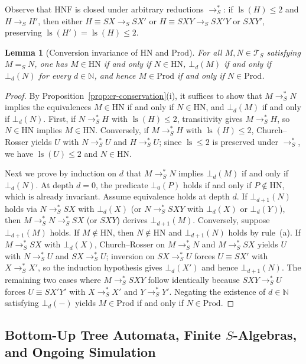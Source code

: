\documentclass[11pt,reqno]{amsart}
\numberwithin{equation}{section}
\theoremstyle{plain}
\newtheorem{lemma}[theorem]{Lemma}
\theoremstyle{definition}
\theoremstyle{remark}
\DeclareMathOperator{\ls}{ls}
\newcommand{\TS}{\mathcal{T}_S}
\newcommand{\HNF}{\mathrm{HNF}}
\newcommand{\HN}{\mathrm{HN}}
\newcommand{\Prod}{\mathrm{Prod}}
\newcommand{\redS}{\to_S}
\newcommand{\redSs}{\to_S^*}
\newcommand{\convS}{=_S}
\begin{document}
Observe that $\HNF$ is closed under arbitrary reductions $\redSs$: if $\ls(H) \le 2$ and $H \redS H'$, then either $H \equiv S X \redS S X'$ or $H \equiv S X Y \redS S X' Y$ or $S X Y'$, preserving $\ls(H') = \ls(H) \le 2$.

\begin{lemma}[Conversion invariance of $\HN$ and $\Prod$]\label{lem:conv-invariance}
For all $M, N \in \TS$ satisfying $M \convS N$, one has $M \in \HN$ if and only if $N \in \HN$, $\bot_d(M)$ if and only if $\bot_d(N)$ for every $d \in \mathbb{N}$, and hence $M \in \Prod$ if and only if $N \in \Prod$.
\end{lemma}

\begin{proof}
By Proposition~\ref{prop:cr-conservation}(i), it suffices to show that $M \redSs N$ implies the equivalences $M \in \HN$ if and only if $N \in \HN$, and $\bot_d(M)$ if and only if $\bot_d(N)$. First, if $N \redSs H$ with $\ls(H) \le 2$, transitivity gives $M \redSs H$, so $N \in \HN$ implies $M \in \HN$. Conversely, if $M \redSs H$ with $\ls(H) \le 2$, Church--Rosser yields $U$ with $N \redSs U$ and $H \redSs U$; since $\ls \le 2$ is preserved under $\redSs$, we have $\ls(U) \le 2$ and $N \in \HN$.

Next we prove by induction on $d$ that $M \redSs N$ implies $\bot_d(M)$ if and only if $\bot_d(N)$. At depth $d = 0$, the predicate $\bot_0(P)$ holds if and only if $P \notin \HN$, which is already invariant. Assume equivalence holds at depth $d$. If $\bot_{d+1}(N)$ holds via $N \redSs S X$ with $\bot_d(X)$ (or $N \redSs S X Y$ with $\bot_d(X)$ or $\bot_d(Y)$), then $M \redSs N \redSs S X$ (or $S X Y$) derives $\bot_{d+1}(M)$. Conversely, suppose $\bot_{d+1}(M)$ holds. If $M \notin \HN$, then $N \notin \HN$ and $\bot_{d+1}(N)$ holds by rule~(a). If $M \redSs S X$ with $\bot_d(X)$, Church--Rosser on $M \redSs N$ and $M \redSs S X$ yields $U$ with $N \redSs U$ and $S X \redSs U$; inversion on $S X \redSs U$ forces $U \equiv S X'$ with $X \redSs X'$, so the induction hypothesis gives $\bot_d(X')$ and hence $\bot_{d+1}(N)$. The remaining two cases where $M \redSs S X Y$ follow identically because $S X Y \redSs U$ forces $U \equiv S X' Y'$ with $X \redSs X'$ and $Y \redSs Y'$. Negating the existence of $d \in \mathbb{N}$ satisfying $\bot_d(-)$ yields $M \in \Prod$ if and only if $N \in \Prod$.
\end{proof}

\subsection{Bottom-Up Tree Automata, Finite \texorpdfstring{$S$}{S}-Algebras, and Ongoing Simulation}\label{subsec:prelim-automata}
\end{document}
